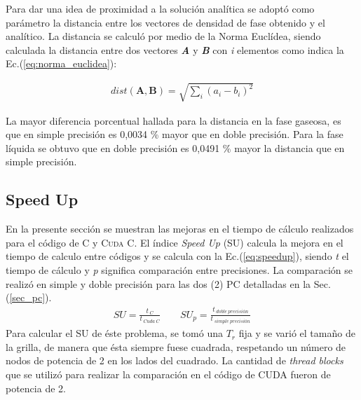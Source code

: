 Para dar una idea de proximidad a la solución analítica se adoptó como parámetro la distancia entre los vectores de densidad de fase obtenido y el analítico. La distancia se calculó por medio de la Norma Euclídea, siendo calculada la distancia entre dos vectores \textbf{\textit{A}} y \textbf{\textit{B}} con \textit{i} elementos como indica la Ec.(\ref{eq:norma_euclidea}):

\begin{align}
dist(\mathbf{A},\mathbf{B}) = \sqrt{\sum_i {\left( a_i - b_i \right)}^2  }
\label{eq:norma_euclidea}
\end{align}


La mayor diferencia porcentual hallada para la distancia en la fase gaseosa, es que en simple precisión es 0,0034 \% mayor que en doble precisión. Para la fase líquida se obtuvo que en doble precisión es 0,0491 \% mayor la distancia que en simple precisión.


%

\newpage

\subsection{Speed Up}

En la presente sección se muestran las mejoras en el tiempo de cálculo realizados para el código de \textsc{C} y \textsc{Cuda C}. El índice \textit{Speed Up} (SU) calcula la mejora en el tiempo de calculo entre códigos y se calcula con la Ec.(\ref{eq:speedup}), siendo \textit{t} el tiempo de cálculo y \textit{p} significa comparación entre precisiones. La comparación se realizó en simple y doble precisión para las dos (2) PC detalladas en la Sec. (\ref{sec_pc}).
\begin{align}
	SU = \frac{t_{\>C}}{t_{\>Cuda \> C}} \qquad 	{SU}_p = \frac{t_{\>doble \> precisión}}{t_{\>simple \> precisión}}
	\label{eq:speedup}
\end{align}
Para calcular el \textsc{SU} de éste problema, se tomó una $T_r$ fija y se varió el tamaño de la grilla, de manera que ésta siempre fuese cuadrada, respetando un número de nodos de potencia de 2 en los lados del cuadrado. La cantidad de \textit{thread blocks} que se utilizó para realizar la comparación en el código de \textsc{CUDA} fueron de potencia de 2.

